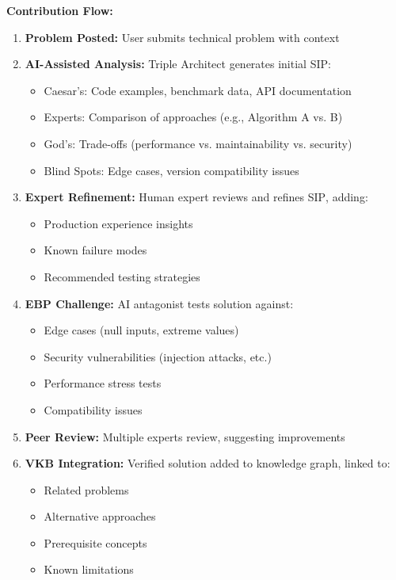 \documentclass[11pt,a4paper]{article}
\theoremstyle{definition}
\theoremstyle{remark}
\newcommand{\VKB}{\textsc{VKB}}
\newcommand{\SIP}{\textsc{SIP}}
\newcommand{\EBP}{\textsc{EBP}}
\begin{document}
\begin{mdframed}[style=implementationbox, frametitle={Stack Overflow 2.0 Architecture}]
\textbf{Contribution Flow:}
\begin{enumerate}
    \item \textbf{Problem Posted:} User submits technical problem with context
    
    \item \textbf{AI-Assisted Analysis:} Triple Architect generates initial \SIP{}:
    \begin{itemize}
        \item Caesar's: Code examples, benchmark data, API documentation
        \item Experts: Comparison of approaches (e.g., Algorithm A vs. B)
        \item God's: Trade-offs (performance vs. maintainability vs. security)
        \item Blind Spots: Edge cases, version compatibility issues
    \end{itemize}
    
    \item \textbf{Expert Refinement:} Human expert reviews and refines \SIP{}, adding:
    \begin{itemize}
        \item Production experience insights
        \item Known failure modes
        \item Recommended testing strategies
    \end{itemize}
    
    \item \textbf{\EBP{} Challenge:} AI antagonist tests solution against:
    \begin{itemize}
        \item Edge cases (null inputs, extreme values)
        \item Security vulnerabilities (injection attacks, etc.)
        \item Performance stress tests
        \item Compatibility issues
    \end{itemize}
    
    \item \textbf{Peer Review:} Multiple experts review, suggesting improvements
    
    \item \textbf{\VKB{} Integration:} Verified solution added to knowledge graph, linked to:
    \begin{itemize}
        \item Related problems
        \item Alternative approaches
        \item Prerequisite concepts
        \item Known limitations
    \end{itemize}
\end{enumerate}


\end{mdframed}
\end{document}
